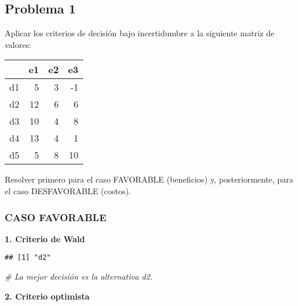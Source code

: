 \documentclass[
]{article}
\newenvironment{Shaded}{\begin{snugshade}}{\end{snugshade}}
\newcommand{\CommentTok}[1]{\textcolor[rgb]{0.56,0.35,0.01}{\textit{#1}}}
\newcommand{\FunctionTok}[1]{\textcolor[rgb]{0.13,0.29,0.53}{\textbf{#1}}}
\newcommand{\NormalTok}[1]{#1}
\newcommand{\OtherTok}[1]{\textcolor[rgb]{0.56,0.35,0.01}{#1}}
\newcommand{\SpecialCharTok}[1]{\textcolor[rgb]{0.81,0.36,0.00}{\textbf{#1}}}
\begin{document}
\subsection{Problema 1}\label{problema-1-2}

Aplicar los criterios de decisión bajo incertidumbre a la siguiente
matriz de valores:

\begin{longtable}[]{@{}lrrr@{}}
\toprule\noalign{}
& e1 & e2 & e3 \\
\midrule\noalign{}
\endhead
\bottomrule\noalign{}
\endlastfoot
d1 & 5 & 3 & -1 \\
d2 & 12 & 6 & 6 \\
d3 & 10 & 4 & 8 \\
d4 & 13 & 4 & 1 \\
d5 & 5 & 8 & 10 \\
\end{longtable}

Resolver primero para el caso FAVORABLE (beneficios) y, posteriormente,
para el caso DESFAVORABLE (costos).

\subsubsection{CASO FAVORABLE}\label{caso-favorable}

\textbf{1. Criterio de Wald}

\begin{Shaded}
\end{Shaded}

\begin{verbatim}
## [1] "d2"
\end{verbatim}

\begin{Shaded}
\begin{Highlighting}[]
\CommentTok{\# La mejor decisión es la alternativa d2.}
\end{Highlighting}
\end{Shaded}

\textbf{2. Criterio optimista}

\begin{Shaded}
\end{Shaded}
\end{document}
